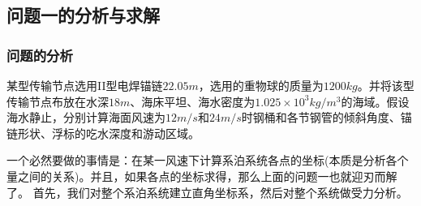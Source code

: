     \subsection{问题一的分析与求解}
        \subsubsection{问题的分析}
            \par
            某型传输节点选用II型电焊锚链$22.05m$，选用的重物球的质量为$1200kg$。并将该型传输节点布放在水深$18m$、海床平坦、海水密度为$1.025\times 10^3kg/m^3$的海域。假设海水静止，分别计算海面风速为$12m/s$和$24m/s$时钢桶和各节钢管的倾斜角度、锚链形状、浮标的吃水深度和游动区域。
            \par
            一个必然要做的事情是：在某一风速下计算系泊系统各点的坐标(本质是分析各个量之间的关系)。并且，如果各点的坐标求得，那么上面的问题一也就迎刃而解了。
            首先，我们对整个系泊系统建立直角坐标系，然后对整个系统做受力分析。

